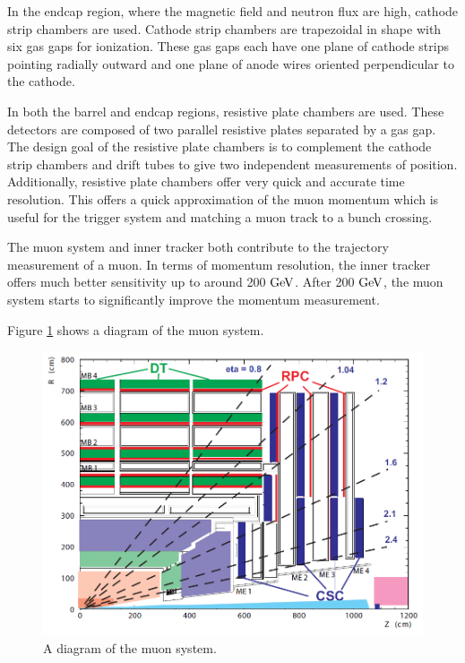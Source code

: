 In the endcap region, where the magnetic field and neutron flux are high, cathode strip chambers are used.  
Cathode strip chambers are trapezoidal in shape with six gas gaps for ionization.  
These gas gaps each have one plane of cathode strips pointing radially outward and one plane of anode wires oriented perpendicular to the cathode.  

In both the barrel and endcap regions, resistive plate chambers are used.  
These detectors are composed of two parallel resistive plates separated by a gas gap.  
The design goal of the resistive plate chambers is to complement the cathode strip chambers and drift tubes to give two independent measurements of position.  
Additionally, resistive plate chambers offer very quick and accurate time resolution.  This offers a 
quick approximation of the muon momentum which is useful for the trigger system and matching a muon track to a bunch crossing.  

The muon system and inner tracker both contribute to the trajectory measurement of a muon.  
In terms of momentum resolution, the inner tracker offers much better sensitivity up to around 200 $\mathrm{GeV}$.  
After 200 $\mathrm{GeV}$, the muon system starts to significantly improve the momentum measurement.

Figure \ref{figs:CMSmuon} shows a diagram of the muon system.  
\begin{figure}
\begin{center}
\includegraphics[width=1.0\linewidth]{figs/CMSmuon.png}
\caption{A diagram of the muon system.}
\label{figs:CMSmuon}
\end{center}
\end{figure}

